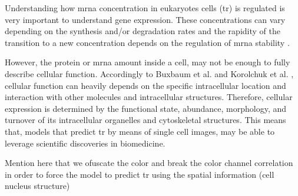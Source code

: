 Understanding how \gls{mrna} concentration in eukaryotes cells (\acrlong{tr}) is regulated is very important to understand gene expression. These concentrations can vary depending on the synthesis and/or degradation rates and the rapidity of the transition to a new concentration depends on the regulation of \gls{mrna} stability \cite{PEREZORTIN2007250}. 

However, the protein or \gls{mrna} amount inside a cell, may not be enough to fully describe cellular function. Accordingly to Buxbaum et al. \cite{Buxbaum_2014} and Korolchuk et al. \cite{Korolchuk2011}, cellular function can heavily depends on the specific intracellular location and interaction with other molecules and intracellular structures. Therefore, cellular expression is determined by the functional state, abundance, morphology, and turnover of its intracellular organelles and cytoskeletal structures. This means that, models that predict \gls{tr} by means of single cell images, may be able to leverage scientific discoveries in biomedicine.

Mention here that we ofuscate the color and break the color channel correlation in order to force the model to predict tr using the spatial information (cell nucleus structure)
